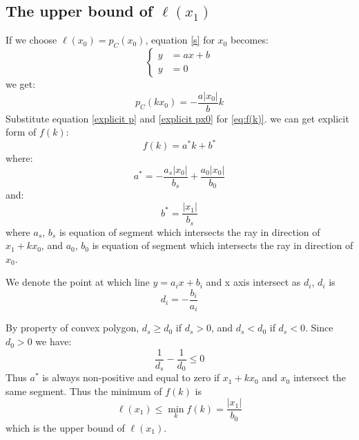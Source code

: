 \documentclass{article}
\newcommand{\abs}[1]{\left\lvert#1\right\rvert}
\begin{document}
\subsection{The upper bound of $\ell(x_1)$}
If we choose $\ell(x_0)=p_C(x_0)$, equation \eqref{s} for $x_0$ becomes:
\begin{equation}\label{eqs:x0}
	\left\{
	\begin{aligned}%
		 y & =ax+b \\
		 y & =0
	\end{aligned}
	\right.
\end{equation}
we get:
\begin{equation}\label{explicit px0}
	p_C(kx_0)=-\frac{a\abs{x_0}}{b}k
\end{equation}
Substitute equation \eqref{explicit p} and \eqref{explicit px0} for \eqref{eq:f(k)}. we can get explicit form of $f(k)$:
\begin{equation}
	f(k)=a^*k+b^*
\end{equation}
where:
\begin{equation}
	a^*=-\frac{a_s\abs{x_0}}{b_s}+\frac{a_0\abs{x_0}}{b_0}
\end{equation}
and:
\begin{equation}
	b^*=\frac{\abs{x_1}}{b_s}
\end{equation}
where $a_s$, $b_s$ is equation of segment which intersects the ray in direction of $x_1+kx_0$, and $a_0$, $b_0$ is equation of segment which 
intersects the ray in direction of $x_0$.\par
We denote the point at which line $y=a_ix+b_i$ and x axis intersect as $d_i$, $d_i$ is
\begin{equation*}
	d_i=-\frac{b_i}{a_i}
\end{equation*}

By property of convex polygon, $d_s\geq d_0$ if $d_s>0$,  and $d_s<d_0$ if $d_s<0$. Since $d_0>0$ we have:
\begin{equation*}
	\frac{1}{d_s}-\frac{1}{d_0}\leq0
\end{equation*}
Thus $a^*$ is always non-positive and equal
to zero if  $x_1+kx_0$ and $x_0$ intersect the same segment.
Thus the minimum of $f(k)$ is
\begin{equation}\label{eq:min of f(k)}
	\ell(x_1)\leq\min_k{f(k)}=\frac{\abs{x_1}}{b_0}
\end{equation}
which is the upper bound of $\ell(x_1)$.\par
\end{document}
